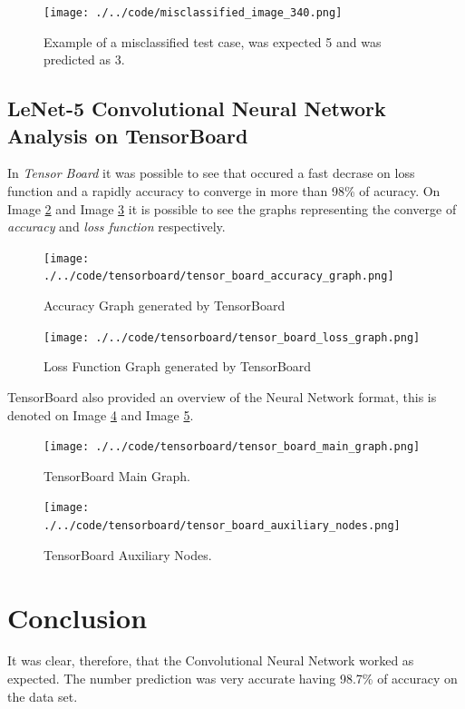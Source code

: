 \documentclass[journal]{IEEEtran}
\begin{document}
\begin{figure}
  \begin{center}
  \texttt{[image: ./../code/misclassified\_image\_340.png]}
  \caption{Example of a misclassified test case, was expected 5 and was predicted as 3.}
  \label{img:misclassification_two}
  \end{center}
\end{figure}

\subsection{LeNet-5 Convolutional Neural Network Analysis on TensorBoard}

In \textit{Tensor Board} it was possible to see that occured a fast decrase on loss function and a rapidly accuracy to converge in more than 98\% of acuracy. On Image \ref{img:accuracy} and Image \ref{img:loss_func} it is possible to see the graphs representing the converge of \textit{accuracy} and \textit{loss function} respectively.

\begin{figure}
  \begin{center}
  \texttt{[image: ./../code/tensorboard/tensor\_board\_accuracy\_graph.png]}
  \caption{Accuracy Graph generated by TensorBoard}
  \label{img:accuracy}
  \end{center}
\end{figure}

\begin{figure}
  \begin{center}
  \texttt{[image: ./../code/tensorboard/tensor\_board\_loss\_graph.png]}
  \caption{Loss Function Graph generated by TensorBoard}
  \label{img:loss_func}
  \end{center}
\end{figure}

TensorBoard also provided an overview of the Neural Network format, this is denoted on Image \ref{img:tensorboard_main} and Image \ref{img:tensorboard_aux}.

\begin{figure}
  \begin{center}
  \texttt{[image: ./../code/tensorboard/tensor\_board\_main\_graph.png]}
  \caption{TensorBoard Main Graph.}
  \label{img:tensorboard_main}
  \end{center}
\end{figure}

\begin{figure}
  \begin{center}
  \texttt{[image: ./../code/tensorboard/tensor\_board\_auxiliary\_nodes.png]}
  \caption{TensorBoard Auxiliary Nodes.}
  \label{img:tensorboard_aux}
  \end{center}
\end{figure}

\section {Conclusion}

It was clear, therefore, that the Convolutional Neural Network worked as expected. The number prediction was very accurate having 98.7\% of accuracy on the data set.

\vfill
\end{document}
